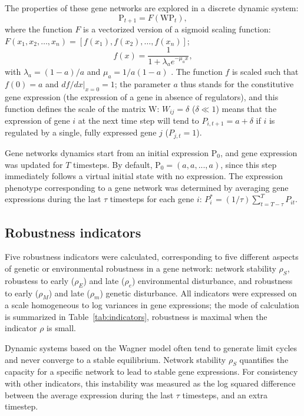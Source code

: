 \documentclass[10pt,a4paper]{article}
\newcommand{\stability}{{\rho_S}}
\newcommand{\earlyenv}{{\rho_E}}
\newcommand{\lateenv}{{\rho_e}}
\newcommand{\earlymut}{{\rho_M}}
\newcommand{\latemut}{{\rho_m}}
\newcommand{\W}{\bm{\mathrm W}}
\newcommand{\Pp}{\bm{\mathrm P}}
\begin{document}
The properties of these gene networks are explored in a discrete dynamic system:
\begin{equation}
 \Pp_{t+1} = F(\W \Pp_t),
\end{equation}
\noindent where the function $F$ is a vectorized version of a sigmoid scaling function: $F(x_1, x_2, \dots, x_n) = [f(x_1), f(x_2), \dots, f(x_n)]$;
\begin{equation} \label{eq:fx}
f(x) = \frac{1}{1+ \lambda_a e ^{- \mu_a x}}, 
\end{equation}
\noindent with $\lambda_a = (1-a)/a$ and $\mu_a = 1/a(1-a)$ \citep{GCL+18}. The function $f$ is scaled such that $f(0) = a$ and $df/dx|_{x=0}=1$; the parameter $a$ thus stands for the constitutive gene expression (the expression of a gene in absence of regulators), and this function defines the scale of the matrix $\W$: $W_{ij} = \delta$ ($\delta \ll 1$) means that the expression of gene $i$ at the next time step will tend to $P_{i,t+1} = a + \delta$ if $i$ is regulated by a single, fully expressed gene $j$ ($P_{j,t} = 1$).

Gene networks dynamics start from an initial expression $\Pp_0$, and gene expression was updated for $T$ timesteps. By default, $\Pp_0 = (a, a, ..., a)$, since this step immediately follows a virtual initial state with no expression. The expression phenotype corresponding to a gene network was determined by averaging gene expressions during the last $\tau$ timesteps for each gene $i$: $P_i^* = (1/\tau)\sum_{t=T-\tau}^T P_{it}$. 

\subsection{Robustness indicators}

Five robustness indicators were calculated, corresponding to five different aspects of genetic or environmental robustness in a gene network: network stability $\stability$, robustess to early ($\earlyenv$) and late ($\lateenv$) environmental disturbance, and robustness to early ($\earlymut$) and late ($\latemut$) genetic disturbance. All indicators were expressed on a scale homogeneous to log variances in gene expressions; the mode of calculation is summarized in Table~\ref{tab:indicators}, robustness is maximal when the indicator $\rho$ is small. 

Dynamic systems based on the Wagner model often tend to generate limit cycles and never converge to a stable equilibrium. Network stability $\stability$ quantifies the capacity for a specific network to lead to stable gene expressions.  For consistency with other indicators, this instability was measured as the log squared difference between the average expression during the last $\tau$ timesteps, and an extra timestep. 
\end{document}
